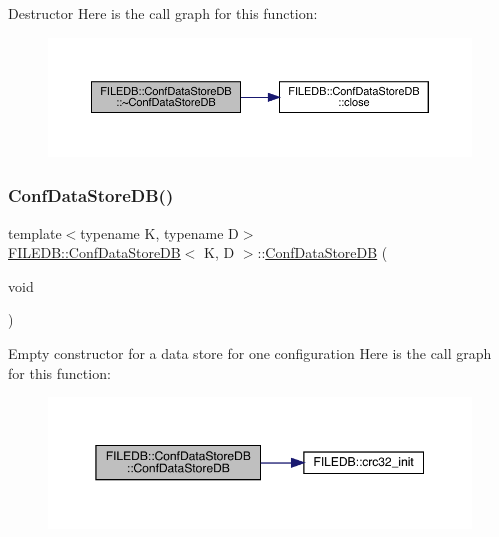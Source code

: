 Destructor Here is the call graph for this function\+:
\nopagebreak
\begin{figure}[H]
\begin{center}
\leavevmode
\includegraphics[width=350pt]{d8/d19/classFILEDB_1_1ConfDataStoreDB_a39b48750dbc9bd0d4ca8c9787edee897_cgraph}
\end{center}
\end{figure}
\mbox{\label{classFILEDB_1_1ConfDataStoreDB_a575d901daeccae08bcda5b2a60681e1b}} 
\subsubsection{\texorpdfstring{ConfDataStoreDB()}{ConfDataStoreDB()}\hspace{0.1cm}{\footnotesize\ttfamily [2/2]}}
{\footnotesize\ttfamily template$<$typename K, typename D$>$ \\
\mbox{\hyperlink{classFILEDB_1_1ConfDataStoreDB}{F\+I\+L\+E\+D\+B\+::\+Conf\+Data\+Store\+DB}}$<$ K, D $>$\+::\mbox{\hyperlink{classFILEDB_1_1ConfDataStoreDB}{Conf\+Data\+Store\+DB}} (\begin{DoxyParamCaption}\item[{void}]{ }\end{DoxyParamCaption})\hspace{0.3cm}{\ttfamily [inline]}}

Empty constructor for a data store for one configuration Here is the call graph for this function\+:
\nopagebreak
\begin{figure}[H]
\begin{center}
\leavevmode
\includegraphics[width=350pt]{d8/d19/classFILEDB_1_1ConfDataStoreDB_a575d901daeccae08bcda5b2a60681e1b_cgraph}
\end{center}
\end{figure}
\mbox{\label{classFILEDB_1_1ConfDataStoreDB_a39b48750dbc9bd0d4ca8c9787edee897}} 
